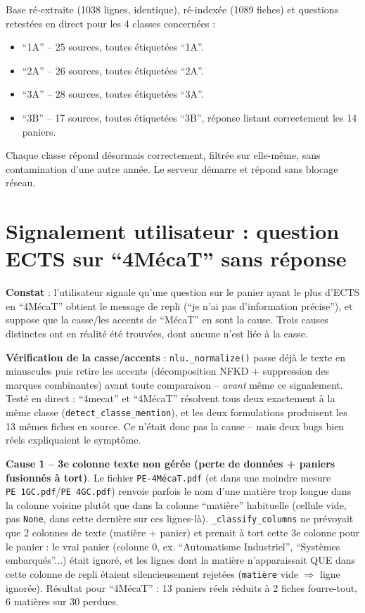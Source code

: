 \documentclass[11pt,a4paper]{report}
\begin{document}
\begin{statutfait}
Base ré-extraite (1038 lignes, identique), ré-indexée (1089 fiches) et
questions retestées en direct pour les 4 classes concernées :
\begin{itemize}
    \item ``1A'' -- 25 sources, toutes étiquetées ``1A''.
    \item ``2A'' -- 26 sources, toutes étiquetées ``2A''.
    \item ``3A'' -- 28 sources, toutes étiquetées ``3A''.
    \item ``3B'' -- 17 sources, toutes étiquetées ``3B'', réponse listant
    correctement les 14 paniers.
\end{itemize}
Chaque classe répond désormais correctement, filtrée sur elle-même, sans
contamination d'une autre année. Le serveur démarre et répond sans blocage
réseau.
\end{statutfait}

\section{Signalement utilisateur : question ECTS sur ``4MécaT'' sans réponse}

\textbf{Constat} : l'utilisateur signale qu'une question sur le panier ayant
le plus d'ECTS en ``4MécaT'' obtient le message de repli (``je n'ai pas
d'information précise''), et suppose que la casse/les accents de ``MécaT''
en sont la cause. Trois causes distinctes ont en réalité été trouvées, dont
aucune n'est liée à la casse.

\textbf{Vérification de la casse/accents} : \texttt{nlu.\_normalize()} passe
déjà le texte en minuscules puis retire les accents (décomposition NFKD +
suppression des marques combinantes) avant toute comparaison -- \emph{avant}
même ce signalement. Testé en direct : ``4mecat'' et ``4MécaT'' résolvent
tous deux exactement à la même classe (\texttt{detect\_classe\_mention}), et
les deux formulations produisent les 13 mêmes fiches en source. Ce n'était
donc pas la cause -- mais deux bugs bien réels expliquaient le symptôme.

\textbf{Cause 1 -- 3e colonne texte non gérée (perte de données + paniers
fusionnés à tort)}. Le fichier \texttt{PE-4MécaT.pdf} (et dans une moindre
mesure \texttt{PE~1GC.pdf}/\texttt{PE~4GC.pdf}) renvoie parfois le nom d'une
matière trop longue dans la colonne voisine plutôt que dans la colonne
``matière'' habituelle (cellule vide, pas \texttt{None}, dans cette dernière
sur ces lignes-là). \texttt{\_classify\_columns} ne prévoyait que 2 colonnes
de texte (matière + panier) et prenait à tort cette 3e colonne pour le
panier : le vrai panier (colonne 0, ex. ``Automatisme Industriel'',
``Systèmes embarqués''...) était ignoré, et les lignes dont la matière
n'apparaissait QUE dans cette colonne de repli étaient silencieusement
rejetées (\texttt{matière} vide $\Rightarrow$ ligne ignorée). Résultat pour
``4MécaT'' : 13 paniers réels réduits à 2 fiches fourre-tout, 6 matières sur
30 perdues.
\end{document}
